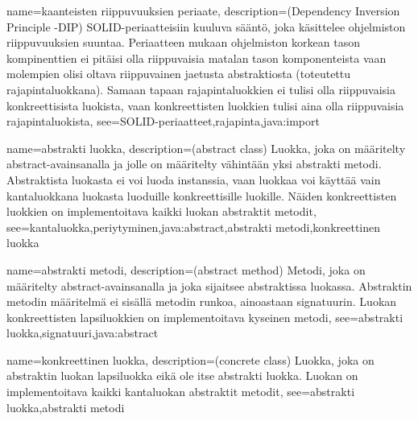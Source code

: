 {
	name=kaanteisten riippuvuuksien periaate,
	description={(Dependency Inversion Principle -DIP) SOLID-periaatteisiin kuuluva sääntö, joka
käsittelee ohjelmiston riippuvuuksien suuntaa. Periaatteen mukaan ohjelmiston korkean tason
kompinenttien ei pitäisi olla riippuvaisia matalan tason komponenteista vaan molempien olisi
oltava riippuvainen jaetusta abstraktiosta (toteutettu rajapintaluokkana). Samaan tapaan
rajapintaluokkien ei tulisi olla riippuvaisia konkreettisista luokista, vaan konkreettisten 
luokkien tulisi aina olla riippuvaisia rajapintaluokista},
	see={SOLID-periaatteet,rajapinta,java:import}
}

{
	name=abstrakti luokka,
	description={(abstract class) Luokka, joka on määritelty abstract-avainsanalla ja jolle on
määritelty vähintään yksi abstrakti metodi. Abstraktista luokasta ei voi luoda instanssia, vaan
luokkaa voi käyttää vain kantaluokkana luokasta luoduille konkreettisille luokille. Näiden
konkreettisten luokkien on implementoitava kaikki luokan abstraktit metodit},
	see={kantaluokka,periytyminen,java:abstract,abstrakti metodi,konkreettinen luokka}
}

{
	name=abstrakti metodi,
	description={(abstract method) Metodi, joka on määritelty abstract-avainsanalla ja joka
sijaitsee abstraktissa luokassa. Abstraktin metodin määritelmä ei sisällä metodin runkoa,
ainoastaan signatuurin. Luokan konkreettisten lapsiluokkien on implementoitava kyseinen metodi},
	see={abstrakti luokka,signatuuri,java:abstract}
}

{
	name=konkreettinen luokka,
	description={(concrete class) Luokka, joka on abstraktin luokan lapsiluokka eikä ole itse
abstrakti luokka. Luokan on implementoitava kaikki kantaluokan abstraktit metodit},
	see={abstrakti luokka,abstrakti metodi}
}